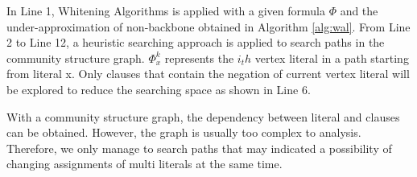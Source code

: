 In Line 1, Whitening Algorithms is applied with a given formula $\Phi$ and the under-approximation of non-backbone obtained in Algorithm \ref{alg:wal}. From Line 2 to Line 12, a heuristic searching approach is applied to search paths in the community structure graph. $\Phi^k_x$ represents the $i_th$ vertex literal in a path starting from literal x. Only clauses that contain the negation of current vertex literal will be explored to reduce the searching space as shown in Line 6.

With a community structure graph, the dependency between literal and clauses can be obtained. However, the graph is usually too complex to analysis. Therefore, we only manage to search paths that may indicated a possibility of changing assignments of multi literals at the same time.




